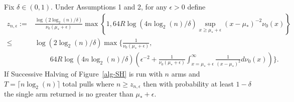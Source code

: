 \begin{theorem}\label{thm:main}
Fix $\delta \in (0,1)$. Under Assumptions 1 and 2, for any $\epsilon >0$ define
\begin{align*}
z_{n,\epsilon} :=& \frac{\log(2 \log_2(n)/\delta)}{  \nu_0(\mu_* + \epsilon)} \max\left\{ 1, 64 R \log(4 n \log_2(n) /\delta) \sup_{x \geq \mu_* + \epsilon}  (x-\mu_*)^{-2}  \nu_0(x) \right\}\\
\leq& \log(2 \log_2(n)/\delta) \max\Bigg\{ \frac{1}{\nu_0(\mu_* + \epsilon)},
\\ &~~~~~~~~~~
64 R \log(4 n \log_2(n) /\delta) \left( \epsilon^{-2} + \frac{1}{\nu_0(\mu_* + \epsilon)}\int_{x = \mu_* + \epsilon}^\infty  \frac{1}{(x-\mu_*)^{2}}  d\nu_0(x) \right) \Bigg\}.
\end{align*}
If Successive Halving of Figure~\ref{alg-SH} is run with $n$ arms and $T=\lceil n \log_2(n) \rceil$ total pulls where $n \geq z_{n,\epsilon}$ then with probability at least $1-\delta$ the single arm returned is no greater than $\mu_* +\epsilon$.
\end{theorem}

